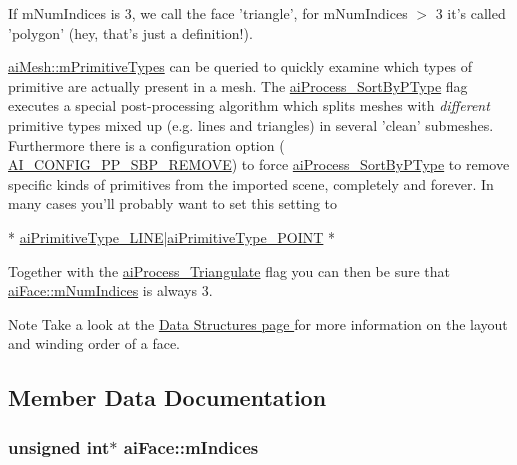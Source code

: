 If m\-Num\-Indices is 3, we call the face 'triangle', for m\-Num\-Indices $>$ 3 it's called 'polygon' (hey, that's just a definition!). \par
 \hyperlink{structai_mesh_a99d66ac0a444068c1b252b30265cbf53}{ai\-Mesh\-::m\-Primitive\-Types} can be queried to quickly examine which types of primitive are actually present in a mesh. The \hyperlink{postprocess_8h_a64795260b95f5a4b3f3dc1be4f52e410ab4484f73635d633cd79973bac1431ed6}{ai\-Process\-\_\-\-Sort\-By\-P\-Type} flag executes a special post-\/processing algorithm which splits meshes with {\itshape different} primitive types mixed up (e.\-g. lines and triangles) in several 'clean' submeshes. Furthermore there is a configuration option ( \hyperlink{config_8h_a971e337cb0d526861142586b8341cb98}{A\-I\-\_\-\-C\-O\-N\-F\-I\-G\-\_\-\-P\-P\-\_\-\-S\-B\-P\-\_\-\-R\-E\-M\-O\-V\-E}) to force \hyperlink{postprocess_8h_a64795260b95f5a4b3f3dc1be4f52e410ab4484f73635d633cd79973bac1431ed6}{ai\-Process\-\_\-\-Sort\-By\-P\-Type} to remove specific kinds of primitives from the imported scene, completely and forever. In many cases you'll probably want to set this setting to 
\begin{DoxyCode}
* \hyperlink{mesh_8h_ac352902280db7c3bd8ba64c133b7f03fa724184f90f0e408b903d07aed39914b4}{aiPrimitiveType\_LINE}|\hyperlink{mesh_8h_ac352902280db7c3bd8ba64c133b7f03fafb9158b4924ec9457647c759aa961053}{aiPrimitiveType\_POINT}
* 
\end{DoxyCode}
 Together with the \hyperlink{postprocess_8h_a64795260b95f5a4b3f3dc1be4f52e410a9c3de834f0307f31fa2b1b6d05dd592b}{ai\-Process\-\_\-\-Triangulate} flag you can then be sure that \hyperlink{structai_face_adda2698cec0ebfe651572f4a5701360b}{ai\-Face\-::m\-Num\-Indices} is always 3. \begin{DoxyNote}{Note}
Take a look at the \hyperlink{_s_d_l__opengl_8h_ac9634855c3eeb1810f03fe3bc4939dc5}{Data Structures page } for more information on the layout and winding order of a face. 
\end{DoxyNote}


\subsection{Member Data Documentation}
\hypertarget{structai_face_a2026b434c40cf1636f9f464a592ec36c}{
\subsubsection[{m\-Indices}]{\setlength{\rightskip}{0pt plus 5cm}unsigned {\bf int}$\ast$ ai\-Face\-::m\-Indices}}\label{structai_face_a2026b434c40cf1636f9f464a592ec36c}


